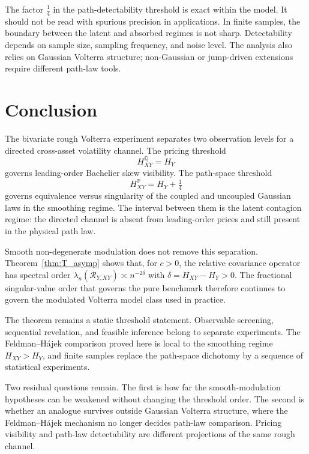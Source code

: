 \documentclass[11pt,a4paper]{amsart}
\theoremstyle{plain}
\theoremstyle{definition}
\theoremstyle{remark}
\newcommand{\Q}{\mathbb{Q}}
\newcommand{\PP}{\mathbb{P}}
\begin{document}
The factor $\tfrac14$ in the path-detectability threshold is exact within the model.  It should not
be read with spurious precision in applications.  In finite samples, the boundary between the latent
and absorbed regimes is not sharp.  Detectability depends on sample size, sampling frequency, and
noise level.  The analysis also relies on Gaussian Volterra structure; non-Gaussian or jump-driven
extensions require different path-law tools.

\section{Conclusion}\label{sec:conclusion}

The bivariate rough Volterra experiment separates two observation levels for a directed
cross-asset volatility channel.  The pricing threshold
\[
H^{\Q}_{XY}=H_Y
\]
governs leading-order Bachelier skew visibility.  The path-space threshold
\[
H^{\PP}_{XY}=H_Y+\tfrac14
\]
governs equivalence versus singularity of the coupled and uncoupled Gaussian laws in the smoothing
regime.  The interval between them is the latent contagion regime: the directed channel is absent
from leading-order prices and still present in the physical path law.

Smooth non-degenerate modulation does not remove this separation.  Theorem~\ref{thm:T_asymp} shows
that, for $c>0$, the relative covariance operator has spectral order
\(\lambda_n(\mathcal R_{Y,XY})\asymp n^{-2\delta}\) with \(\delta=H_{XY}-H_Y>0\).  The fractional
singular-value order that governs the pure benchmark therefore continues to govern the modulated
Volterra model class used in practice.

The theorem remains a static threshold statement.  Observable screening, sequential revelation,
and feasible inference belong to separate experiments.  The Feldman--H\'ajek comparison proved here
is local to the smoothing regime \(H_{XY}>H_Y\), and finite samples replace the path-space dichotomy
by a sequence of statistical experiments.

Two residual questions remain.  The first is how far the smooth-modulation hypotheses can be
weakened without changing the threshold order.  The second is whether an analogue survives outside
Gaussian Volterra structure, where the Feldman--H\'ajek mechanism no longer decides path-law
comparison.  Pricing visibility and path-law detectability are different projections of the same
rough channel.



\end{document}
